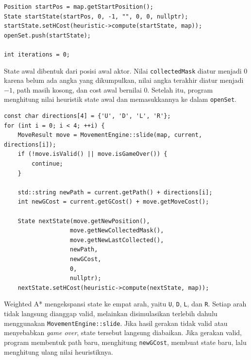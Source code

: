 \begin{tcolorbox}[
	colback=purple!5,
	colframe=purple!60!black,
	title=\textbf{Potongan Source Code Asli: Inisialisasi State Awal Weighted A*},
	arc=2mm,
	boxrule=0.8pt
]
\small
\begin{verbatim}
Position startPos = map.getStartPosition();
State startState(startPos, 0, -1, "", 0, 0, nullptr);
startState.setHCost(heuristic->compute(startState, map));
openSet.push(startState);

int iterations = 0;
\end{verbatim}
\end{tcolorbox}

State awal dibentuk dari posisi awal aktor. 
Nilai \texttt{collectedMask} diatur menjadi $0$ karena belum ada angka yang dikumpulkan, nilai angka terakhir diatur menjadi $-1$, path masih kosong, dan cost awal bernilai $0$. 
Setelah itu, program menghitung nilai heuristik state awal dan memasukkannya ke dalam \texttt{openSet}.

\begin{tcolorbox}[
	colback=purple!5,
	colframe=purple!60!black,
	title=\textbf{Potongan Source Code Asli: Ekspansi State pada Weighted A*},
	arc=2mm,
	boxrule=0.8pt
]
\small
\begin{verbatim}
const char directions[4] = {'U', 'D', 'L', 'R'};
for (int i = 0; i < 4; ++i) {
    MoveResult move = MovementEngine::slide(map, current, directions[i]);
    if (!move.isValid() || move.isGameOver()) {
        continue;
    }

    std::string newPath = current.getPath() + directions[i];
    int newGCost = current.getGCost() + move.getMoveCost();

    State nextState(move.getNewPosition(),
                   move.getNewCollectedMask(),
                   move.getNewLastCollected(),
                   newPath,
                   newGCost,
                   0,
                   nullptr);
    nextState.setHCost(heuristic->compute(nextState, map));
\end{verbatim}
\end{tcolorbox}

Weighted A* mengekspansi state ke empat arah, yaitu \texttt{U}, \texttt{D}, \texttt{L}, dan \texttt{R}. 
Setiap arah tidak langsung dianggap valid, melainkan disimulasikan terlebih dahulu menggunakan \texttt{MovementEngine::slide}. 
Jika hasil gerakan tidak valid atau menyebabkan \textit{game over}, state tersebut langsung diabaikan. 
Jika gerakan valid, program membentuk path baru, menghitung \texttt{newGCost}, membuat state baru, lalu menghitung ulang nilai heuristiknya.


